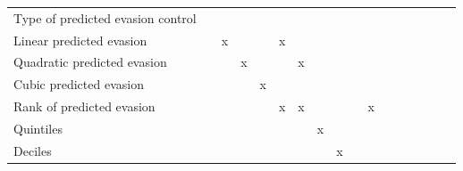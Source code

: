 \begin{tabular}{lcccccccccccccccc}
\midrule
Type of predicted evasion control&                     &                     &                     &                     &                     &                     &                     &                     &                     &                     &                     &                     &                     &                     &                     &                     \\
Linear predicted evasion&                     &           x         &                     &                     &           x         &                     &                     &                     &                     &                     &                     &                     &                     &                     &                     &                     \\
Quadratic predicted evasion&                     &                     &           x         &                     &                     &           x         &                     &                     &                     &                     &                     &                     &                     &                     &                     &                     \\
Cubic predicted evasion&                     &                     &                     &           x         &                     &                     &                     &                     &                     &                     &                     &                     &                     &                     &                     &                     \\
Rank of predicted evasion&                     &                     &                     &                     &           x         &           x         &                     &                     &                     &           x         &                     &                     &                     &                     &                     &                     \\
Quintiles   &                     &                     &                     &                     &                     &                     &           x         &                     &                     &                     &                     &                     &                     &                     &                     &                     \\
Deciles     &                     &                     &                     &                     &                     &                     &                     &           x         &                     &                     &                     &                     &                     &                     &                     &                     \\

\end{tabular}
